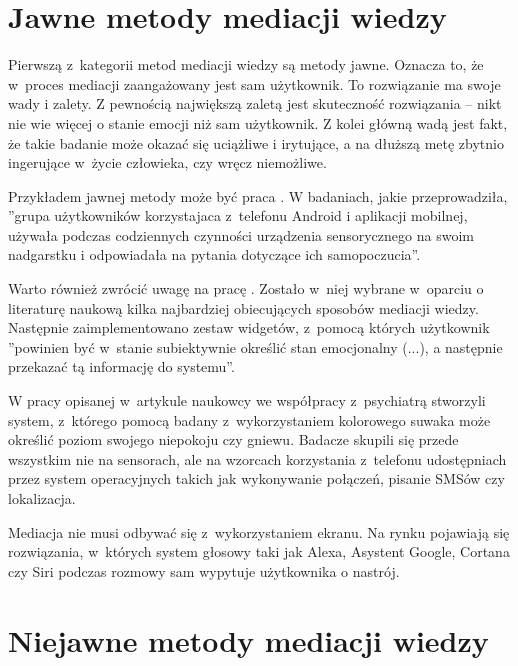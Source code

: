 
\section{Jawne metody mediacji wiedzy}
\label{sec:jawneMetodyMediacjiWiedzy}

Pierwszą z~kategorii metod mediacji wiedzy są metody jawne. Oznacza to, że w~proces mediacji zaangażowany jest sam użytkownik. To rozwiązanie ma swoje wady i zalety. Z pewnością największą zaletą jest skuteczność rozwiązania -- nikt nie wie więcej o stanie emocji niż sam użytkownik. Z kolei główną wadą jest fakt, że takie badanie może okazać się uciążliwe i irytujące, a na dłuższą metę zbytnio ingerujące w~życie człowieka, czy wręcz niemożliwe.

Przykładem jawnej metody może być praca \cite{EmiliaPieczonka}. W badaniach, jakie przeprowadziła, ''grupa użytkowników korzystajaca z~telefonu Android i aplikacji mobilnej, używała podczas codziennych czynności urządzenia sensorycznego na swoim nadgarstku i odpowiadała na pytania dotyczące ich samopoczucia''.

Warto również zwrócić uwagę na pracę \cite{ArkadiuszLis}. Zostało w~niej wybrane w~oparciu o literaturę naukową kilka najbardziej obiecujących sposobów mediacji wiedzy. Następnie zaimplementowano zestaw widgetów, z~pomocą których użytkownik ''powinien być w~stanie subiektywnie określić stan emocjonalny (...), a następnie przekazać tą informację do systemu''.

W pracy opisanej w~artykule \cite{hung2016predicting} naukowcy we współpracy z~psychiatrą stworzyli system, z~którego pomocą badany z~wykorzystaniem kolorowego suwaka może określić poziom swojego niepokoju czy gniewu. Badacze skupili się przede wszystkim nie na sensorach, ale na wzorcach korzystania z~telefonu udostępniach przez system operacyjnych takich jak wykonywanie połączeń, pisanie SMSów czy lokalizacja.

Mediacja nie musi odbywać się z~wykorzystaniem ekranu. Na rynku pojawiają się rozwiązania, w~których system głosowy taki jak Alexa, Asystent Google, Cortana czy Siri podczas rozmowy sam wypytuje użytkownika o nastrój.



\section{Niejawne metody mediacji wiedzy}
\label{sec:niejawneMetodyMediacjiWiedzy}

